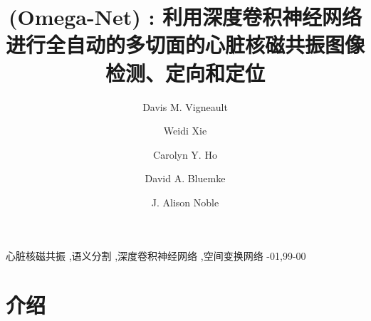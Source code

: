 \documentclass[final,5p]{elsarticlezh}
\newcommand\hl[1]{%
  \bgroup
  \hskip0pt\color{black!80!black}%
  #1%
  \egroup
}
\let\linenumbers\nolinenumbers\nolinenumbers
\begin{document}




\begin{frontmatter}

\title{\omeganet{} \hl{(Omega-Net)}: 利用深度卷积神经网络进行全自动的多切面的心脏核磁共振图像检测、定向和定位}

\author[oxford,nih,tufts]{Davis M. Vigneault}

\author[oxford]{Weidi Xie}
\author[brigham]{Carolyn Y. Ho}
\author[wisc]{David A. Bluemke}
\author[oxford]{J. Alison Noble}

\address[oxford]{Institute of Biomedical Engineering, Department of Engineering, University of Oxford}
\address[nih]{Department of Radiology and Imaging Sciences, Clinical Center, National Institutes of Health}
\address[tufts]{Tufts University School of Medicine, Sackler School of Graduate Biomedical Sciences}
\address[brigham]{Cardiovascular Division, Brigham and Women's Hospital}
\address[wisc]{University of Wisconsin-Madison, School of Medicine and Public Health}


\begin{abstract}



\end{abstract}

\begin{keyword}
心脏核磁共振 \sep 语义分割 \sep 深度卷积神经网络 \sep 空间变换网络
-01\sep  99-00
\end{keyword}

\end{frontmatter}

\linenumbers

\newcommand{\figdir}{./figures/}
\newcommand{\tabdir}{./tables/}


\section{介绍} \label{introduction}


\end{document}

